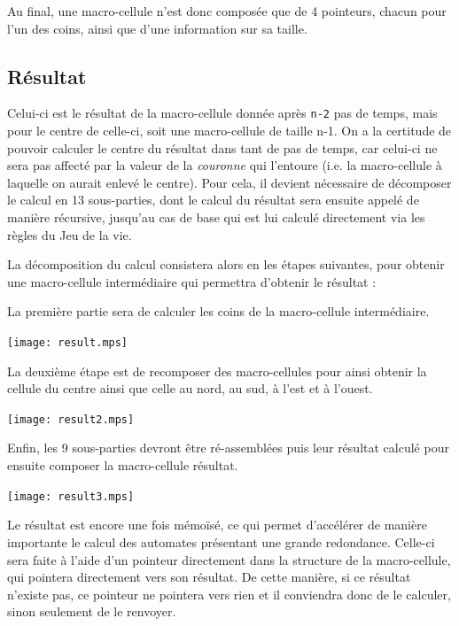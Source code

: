 \documentclass[a4paper,12pt]{report}
\begin{document}
\medskip

Au final, une macro-cellule n'est donc composée que de 4 pointeurs, chacun pour
l'un des coins, ainsi que d'une information sur sa taille.


\subsection*{Résultat}


Celui-ci est le résultat de la macro-cellule donnée après
\texttt{n-2} pas de temps, mais pour le centre de celle-ci, soit une
macro-cellule de taille n-1. On a la certitude de pouvoir calculer le
centre du résultat dans tant de pas de temps, car celui-ci ne sera pas
affecté par la valeur de la \textit{couronne} qui l'entoure (i.e. la
macro-cellule à laquelle on aurait enlevé le centre). Pour cela, il
devient nécessaire de décomposer le calcul en 13 sous-parties, dont le
calcul du résultat sera ensuite appelé de manière récursive, jusqu'au
cas de base qui est lui calculé directement via les règles du Jeu de
la vie. 

La décomposition du calcul consistera alors en les étapes
suivantes, pour obtenir une macro-cellule intermédiaire qui permettra
d'obtenir le résultat :


La première partie sera de calculer les coins de la macro-cellule
  intermédiaire.

\medskip
\begin{center}
  \texttt{[image: result.mps]}
\end{center}
\medskip

La deuxième étape est de recomposer des macro-cellules pour ainsi obtenir
  la cellule du centre ainsi que celle au nord, au sud, à l'est et à l'ouest. 

\medskip
\begin{center}
  \texttt{[image: result2.mps]}
\end{center}
\medskip

Enfin, les 9 sous-parties devront être ré-assemblées puis leur résultat
  calculé pour ensuite composer la macro-cellule résultat.

\medskip 
\begin{center}
  \texttt{[image: result3.mps]}
\end{center}
\medskip

Le résultat est encore une fois mémoïsé, ce qui permet
d'accélérer de manière importante le calcul des automates présentant
une grande redondance. Celle-ci sera faite à l'aide
d'un pointeur directement dans la structure de la macro-cellule, qui
pointera directement vers son résultat. De cette manière, si ce
résultat n'existe pas, ce pointeur ne pointera vers rien et il
conviendra donc de le calculer, sinon seulement de le renvoyer.
\end{document}
